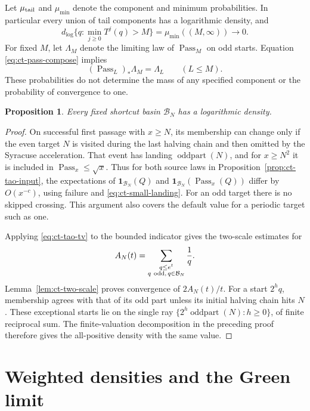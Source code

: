 \documentclass[11pt,a4paper]{article}
\newtheorem{proposition}[theorem]{Proposition}
\begin{document}
Let \(\mu_{\rm tail}\) and \(\mu_{\min}\) denote the component
and minimum probabilities. In particular every union of tail
components has a logarithmic density, and
\begin{equation}\label{eq:ct-min-tight}
 d_{\log}\{q:\min_{j\ge0}T^j(q)>M\}
       =\mu_{\min}((M,\infty))\longrightarrow0.
\end{equation}
For fixed \(M\), let \(\Lambda_M\) denote the limiting law of
\(\operatorname{Pass}_M\) on odd starts. Equation
\eqref{eq:ct-pass-compose} implies
\[
 (\operatorname{Pass}_L)_*\Lambda_M=\Lambda_L\qquad(L\le M).
\]
These probabilities do not determine the mass of any specified
component or the probability of convergence to one.

\begin{proposition}\label{prop:ct-basin-density}
Every fixed shortcut basin \(\mathcal B_N\) has a logarithmic density.
\end{proposition}
\begin{proof}
On successful first passage with \(x\ge N\), its membership can
change only if the even target \(N\) is visited during the last
halving chain and then omitted by the Syracuse acceleration.
That event has landing \(\operatorname{oddpart}(N)\), and for
\(x\ge N^2\) it is included in
\(\operatorname{Pass}_x\le\sqrt x\).
Thus for both source laws in Proposition~\ref{prop:ct-tao-input},
the expectations of
\(\mathbf1_{\mathcal B_N}(Q)\) and
\(\mathbf1_{\mathcal B_N}(\operatorname{Pass}_x(Q))\)
differ by \(O(x^{-c})\), using failure and
\eqref{eq:ct-small-landing}. For an odd target there is no skipped
crossing. This argument also covers the default value for a
periodic target such as one.

Applying \eqref{eq:ct-tao-tv} to the bounded indicator gives the
two-scale estimates for
\[
 A_N(t)=\sum_{\substack{q\le e^t\\q\ {\rm odd},\,q\in\mathcal B_N}}
                         \frac1q.
\]
Lemma~\ref{lem:ct-two-scale} proves convergence of \(2A_N(t)/t\).
For a start \(2^hq\), membership agrees with that of its odd part
unless its initial halving chain hits \(N\). These exceptional
starts lie on the single ray
\(\{2^h\operatorname{oddpart}(N):h\ge0\}\), of finite reciprocal
sum. The finite-valuation decomposition in the preceding proof
therefore gives the all-positive density with the same value.
\end{proof}

\section{Weighted densities and the Green limit}
\end{document}
